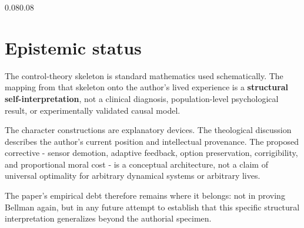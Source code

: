 \documentclass[10pt,letterpaper]{article}
\newenvironment{paperbody}
  {\begin{adjustwidth}{0.08\textwidth}{0.08\textwidth}\justifying}
  {\par\end{adjustwidth}}
\let\oldsection\section
\renewcommand{\section}{\Needspace{6\baselineskip}\oldsection}
\begin{document}
\begin{paperbody}
\section*{Epistemic status}

The control-theory skeleton is standard mathematics used schematically.
The mapping from that skeleton onto the author's lived experience is a
\textbf{structural self-interpretation}, not a clinical diagnosis,
population-level psychological result, or experimentally validated
causal model.

The character constructions are explanatory devices. The theological
discussion describes the author's current position and intellectual
provenance. The proposed corrective - sensor demotion, adaptive
feedback, option preservation, corrigibility, and proportional moral
cost - is a conceptual architecture, not a claim of universal optimality
for arbitrary dynamical systems or arbitrary lives.

The paper's empirical debt therefore remains where it belongs: not in
proving Bellman again, but in any future attempt to establish that this
specific structural interpretation generalizes beyond the authorial
specimen.

\end{paperbody}
\end{document}
